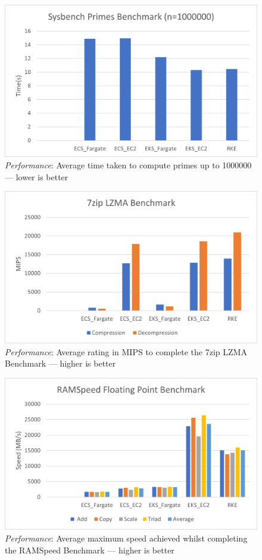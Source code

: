\begin{figure}[hp]
  \includegraphics{images/perf-sysbench.png}
  \caption{\emph{Performance}: Average time taken to compute primes up to 1000000 --- lower is better }
  \label{fig:perf_sysbench}
\end{figure}

\begin{figure}[hp]
  \includegraphics{images/perf-7zip.png}
  \caption{\emph{Performance}: Average rating in MIPS to complete the 7zip LZMA Benchmark --- higher is better}
  \label{fig:perf_7zip}
\end{figure}

\begin{figure}[hp]
  \includegraphics{images/perf-RAMSpeed.png}
  \caption{\emph{Performance}: Average maximum speed achieved whilst completing the RAMSpeed Benchmark --- higher is better}
  \label{fig:perf_RAMSpeed}
\end{figure}

